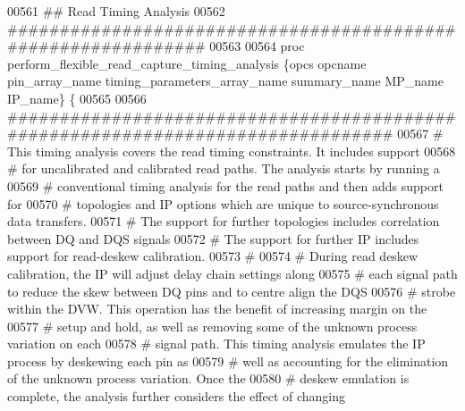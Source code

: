 \begin{DoxyCode}
00561 \textcolor{comment}{}\textcolor{comment}{## Read Timing Analysis}
00562 \textcolor{comment}{}\textcolor{comment}{##############################################################}
00563 \textcolor{comment}{}
00564 \textcolor{keyword}{proc} perform\_flexible\_read\_capture\_timing\_analysis \{opcs opcname pin\_array\_name
       timing\_parameters\_array\_name summary\_name MP\_name IP\_name\} \{
00565 
00566    \textcolor{comment}{################################################################################}
00567 \textcolor{comment}{}\textcolor{comment}{   }\textcolor{comment}{# This timing analysis covers the read timing constraints.  It includes support }
00568 \textcolor{comment}{}\textcolor{comment}{   }\textcolor{comment}{# for uncalibrated and calibrated read paths.  The analysis starts by running a }
00569 \textcolor{comment}{}\textcolor{comment}{   }\textcolor{comment}{# conventional timing analysis for the read paths and then adds support for }
00570 \textcolor{comment}{}\textcolor{comment}{   }\textcolor{comment}{# topologies and IP options which are unique to source-synchronous data transfers.  }
00571 \textcolor{comment}{}\textcolor{comment}{   }\textcolor{comment}{# The support for further topologies includes correlation between DQ and DQS signals}
00572 \textcolor{comment}{}\textcolor{comment}{   }\textcolor{comment}{# The support for further IP includes support for read-deskew calibration.}
00573 \textcolor{comment}{}\textcolor{comment}{   }\textcolor{comment}{# }
00574 \textcolor{comment}{}\textcolor{comment}{   }\textcolor{comment}{# During read deskew calibration, the IP will adjust delay chain settings along }
00575 \textcolor{comment}{}\textcolor{comment}{   }\textcolor{comment}{# each signal path to reduce the skew between DQ pins and to centre align the DQS }
00576 \textcolor{comment}{}\textcolor{comment}{   }\textcolor{comment}{# strobe within the DVW.  This operation has the benefit of increasing margin on the }
00577 \textcolor{comment}{}\textcolor{comment}{   }\textcolor{comment}{# setup and hold, as well as removing some of the unknown process variation on each }
00578 \textcolor{comment}{}\textcolor{comment}{   }\textcolor{comment}{# signal path.  This timing analysis emulates the IP process by deskewing each pin as }
00579 \textcolor{comment}{}\textcolor{comment}{   }\textcolor{comment}{# well as accounting for the elimination of the unknown process variation.  Once the }
00580 \textcolor{comment}{}\textcolor{comment}{   }\textcolor{comment}{# deskew emulation is complete, the analysis further considers the effect of changing }

\end{DoxyCode}
